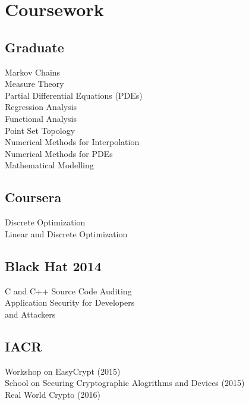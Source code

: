 \documentclass[letterpaper]{clinton-resume}
\begin{document}
\newpage%
\begin{minipage}[t]{0.33\textwidth}
\section{Coursework}

\subsection{Graduate}
Markov Chains\\
Measure Theory\\
Partial Differential Equations (PDEs)\\
Regression Analysis\\
Functional Analysis\\
Point Set Topology\\
Numerical Methods for Interpolation\\
Numerical Methods for PDEs\\
Mathematical Modelling\\
\subsection{Coursera}
Discrete Optimization\\
Linear and Discrete Optimization\\
\subsection{Black Hat 2014}
C and C++ Source Code Auditing\\
Application Security for Developers\\and Attackers\\
\subsection{IACR}
Workshop on EasyCrypt (2015)\\
School on Securing Cryptographic Alogrithms and Devices (2015)\\
Real World Crypto (2016)
\end{minipage}
\end{document}
